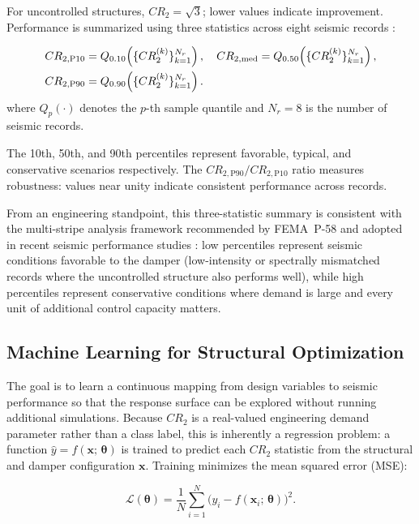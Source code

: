 \documentclass[preprint,12pt,authoryear]{elsarticle}
\newcommand{\CR}[1]{CR_{2,\text{#1}}}
\begin{document}
For uncontrolled structures, $CR_2 = \sqrt{3}$; lower values indicate improvement. Performance is summarized using three statistics across eight seismic records \citep{Kazemi2022}:

\begin{align}
	\CR{P10} &= Q_{0.10}\!\left(\{CR_2^{(k)}\}_{k=1}^{N_r}\right), \quad
	\CR{med}  = Q_{0.50}\!\left(\{CR_2^{(k)}\}_{k=1}^{N_r}\right), \notag\\
	\CR{P90} &= Q_{0.90}\!\left(\{CR_2^{(k)}\}_{k=1}^{N_r}\right).
	\label{eq:CR2stats}
\end{align}
where $Q_p(\cdot)$ denotes the $p$-th sample quantile and $N_r = 8$ is the
number of seismic records.

The 10th, 50th, and 90th percentiles represent favorable, typical, and conservative scenarios respectively. The $\CR{P90}/\CR{P10}$ ratio measures robustness: values near unity indicate consistent performance across records.

From an engineering standpoint, this three-statistic summary is consistent
with the multi-stripe analysis framework recommended by FEMA~P-58
\citep{FEMAP58} and adopted in recent seismic performance studies
\citep{Kazemi2022}: low percentiles represent seismic conditions favorable
to the damper (low-intensity or spectrally mismatched records where the
uncontrolled structure also performs well), while high percentiles represent
conservative conditions where demand is large and every unit of additional
control capacity matters. 

\subsection{Machine Learning for Structural Optimization}
\label{sec:theory:ml}

The goal is to learn a continuous mapping from design variables to seismic performance so that the response surface can be explored without running additional simulations. Because $CR_2$ is a real-valued engineering demand parameter rather than a class label, this is inherently a regression problem: a function $\hat{y} = f(\bm{x};\,\bm{\theta})$ is trained to predict each $CR_2$ statistic from the structural and damper configuration $\bm{x}$. Training minimizes the mean squared error (MSE):

\begin{equation}
	\mathcal{L}(\bm{\theta}) = \frac{1}{N}\sum_{i=1}^{N}
	\bigl(y_i - f(\bm{x}_i;\,\bm{\theta})\bigr)^2.
	\label{eq:mse}
\end{equation}
\end{document}
